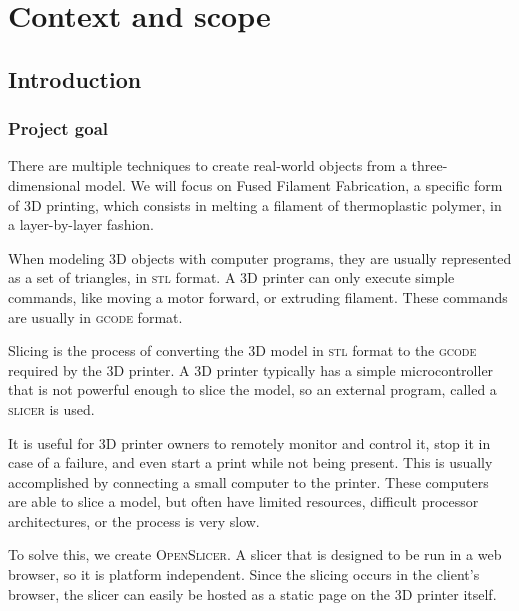 \section{Context and scope}

\subsection{Introduction}
\subsubsection{Project goal}
There are multiple techniques to create real-world objects from a three-dimensional model.
We will focus on Fused Filament Fabrication, a specific form of 3D printing, which consists in melting a filament of thermoplastic polymer, in a layer-by-layer fashion.

When modeling 3D objects with computer programs, they are usually represented as a set of triangles, in \textsc{stl} format. A 3D printer can only execute simple commands, like moving a motor forward, or extruding filament. These commands are usually in \textsc{gcode} format.

Slicing is the process of converting the 3D model in \textsc{stl} format to the \textsc{gcode} required by the 3D printer. A 3D printer typically has a simple microcontroller that is not powerful enough to slice the model, so an external program, called a \textsc{slicer} is used.

It is useful for 3D printer owners to remotely monitor and control it, stop it in case of a failure, and even start a print while not being present. This is usually accomplished by connecting a small computer to the printer. These computers  are able to slice a model, but often have limited resources, difficult processor architectures, or the process is very slow.

To solve this, we create \textsc{OpenSlicer}. A slicer that is designed to be run in a web browser, so it is platform independent. Since the slicing occurs in the client's browser, the slicer can easily be hosted as a static page on the 3D printer itself.


